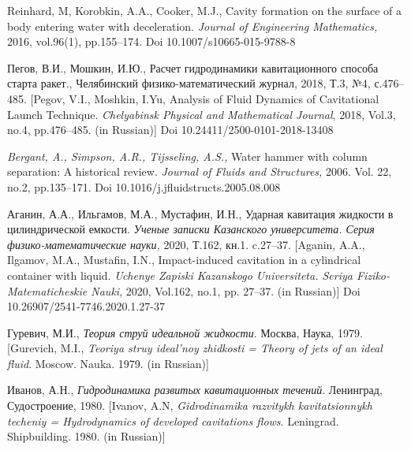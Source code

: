 \documentclass[press]{vestnik}
\begin{document}
\begin{thebibliography}{10}
Reinhard, M, Korobkin, A.A., Cooker, M.J., Cavity formation on the surface of a body entering water with deceleration. \textit{Journal of Engineering Mathematics,} 2016, vol.96(1), pp.155--174. Doi 10.1007/s10665-015-9788-8

Пегов, В.И., Мошкин, И.Ю., Расчет гидродинамики кавитационного способа старта ракет., Челябинский физико-математический журнал, 2018, Т.3, №4, с.476--485. [Pegov, V.I., Moshkin, I.Yu, Analysis of Fluid Dynamics of Cavitational Launch Technique. \textit{Chelyabinsk Physical and Mathematical Journal}, 2018, Vol.3, no.4, pp.476--485. (in Russian)] Doi 10.24411/2500-0101-2018-13408

\textit{Bergant, A., Simpson, A.R., Tijsseling, A.S.,} Water hammer with column separation: A historical review. \textit{Journal of Fluids and Structures,} 2006. Vol. 22, no.2, pp.135--171. Doi 10.1016/j.jfluidstructs.2005.08.008

Аганин, А.А., Ильгамов, М.А., Мустафин, И.Н., Ударная кавитация жидкости в цилиндрической емкости. \textit{Ученые записки Казанского университета. Серия физико-математические науки, }2020, Т.162, кн.1. c.27--37. [Aganin, A.A., Ilgamov, M.A., Mustafin, I.N., Impact-induced cavitation in a cylindrical container with liquid. \textit{Uchenye Zapiski Kazanskogo Universiteta. Seriya Fiziko-Matematicheskie Nauki}, 2020, Vol.162, no.1, pp. 27--37. (in Russian)] Doi 10.26907/2541-7746.2020.1.27-37

Гуревич, М.И.,\textit{ Теория струй идеальной жидкости}. Москва, Наука, 1979. [Gurevich, M.I., \textit{Teoriya struy ideal'noy zhidkosti = Theory of jets of an ideal fluid}. Moscow. Nauka. 1979. (in Russian)]

Иванов, А.Н., \textit{Гидродинамика развитых кавитационных течений}. Ленинград, Судостроение, 1980. [Ivanov, A.N, \textit{Gidrodinamika razvitykh kavitatsionnykh techeniy = Hydrodynamics of developed cavitations flows}. Leningrad. Shipbuilding. 1980. (in Russian)] 
\end{thebibliography}
\end{document}
